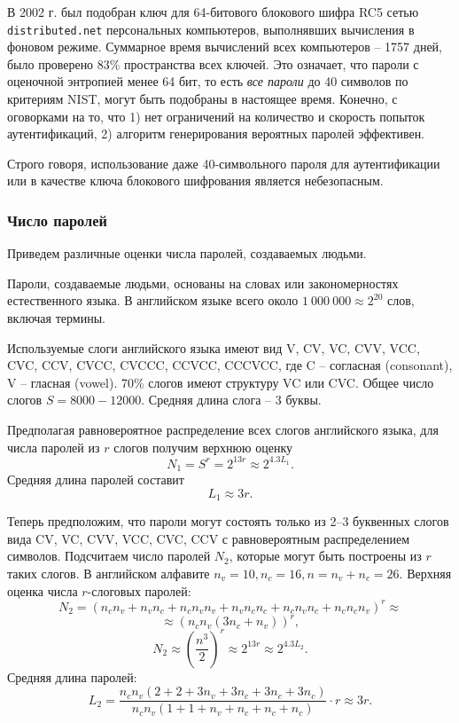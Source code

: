 \documentclass[10pt,a4paper]{book}
\begin{document}
В 2002 г. был подобран ключ для 64-битового блокового шифра RC5 сетью \texttt{distributed.net} персональных компьютеров, выполнявших вычисления в фоновом режиме. Суммарное время вычислений всех компьютеров -- 1757 дней, было проверено 83\% пространства всех ключей. Это означает, что пароли с оценочной энтропией менее 64 бит, то есть \emph{все пароли} до 40 символов по критериям NIST,  могут быть подобраны в настоящее время. Конечно, с оговорками на то, что 1) нет ограничений на количество и скорость попыток аутентификаций, 2) алгоритм генерирования вероятных паролей эффективен.

Строго говоря, использование даже 40-символьного пароля для аутентификации или в качестве ключа блокового шифрования является небезопасным.


\subsubsection{Число паролей}

Приведем различные оценки числа паролей, создаваемых людьми.

Пароли, создаваемые людьми, основаны на словах или закономерностях естественного языка. В английском языке всего около $1\ 000\ 000 \approx 2^{20}$ слов, включая термины.


Используемые слоги английского языка имеют вид V, CV, VC, CVV, VCC, CVC, CCV, CVCC, CVCCC, CCVCC, CCCVCC, где C -- согласная (consonant), V -- гласная (vowel). 70\% слогов имеют структуру VC или CVC. Общее число слогов $S = 8000 - 12000$. Средняя длина слога -- 3 буквы.

Предполагая равновероятное распределение всех слогов английского языка, для числа паролей из $r$ слогов получим верхнюю оценку
    \[ N_1 = S^r = 2^{13 r} \approx 2^{4.3 L_1}. \]
Средняя длина паролей составит
    \[ L_1 \approx 3 r. \]

Теперь предположим, что пароли могут состоять только из 2--3 буквенных слогов вида CV, VC, CVV, VCC, CVC, CCV с равновероятным распределением символов. Подсчитаем число паролей $N_2$, которые могут быть построены из $r$ таких слогов. В английском алфавите $n_v = 10, n_c = 16, n = n_v + n_c = 26$. Верхняя оценка числа $r$-слоговых паролей:
    \[ N_2 = (n_c n_v + n_v n_c + n_c n_v n_v + n_v n_c n_c + n_c n_v n_c + n_c n_c n_v)^r \approx \]
        \[ \approx \left( n_c n_v(3 n_c + n_v) \right)^r, \]
    \[ N_2 \approx \left( \frac{n^3}{2} \right)^r \approx 2^{13 r} \approx 2^{4.3 L_2}. \]
Средняя длина паролей:
    \[ L_2 = \frac{n_c n_v(2 + 2 + 3 n_v + 3 n_c + 3 n_c + 3 n_c)}{n_c n_v (1 + 1 + n_v + n_c + n_c + n_c)} \cdot r \approx 3 r. \]
\end{document}
